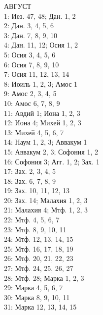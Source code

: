 \documentclass[fontsize=16pt,letterpaper,DIV=6]{scrartcl}
\begin{document}
\begin{multicols}{2}
АВГУСТ
\\  1: Иез. 47, 48; Дан. 1, 2
\\  2: Дан. 3, 4, 5, 6
\\  3: Дан. 7, 8, 9, 10
\\  4: Дан. 11, 12; Осия 1, 2
\\  5: Осия 3, 4, 5, 6
\\  6: Осия 7, 8, 9, 10
\\  7: Осия 11, 12, 13, 14
\\  8: Иоиль 1, 2, 3; Амос 1
\\  9: Амос 2, 3, 4, 5
\\  10: Амос 6, 7, 8, 9
\\  11: Авдий 1; Иона 1, 2, 3
\\  12: Иона 4; Михей 1, 2, 3
\\  13: Михей 4, 5, 6, 7
\\  14: Наум 1, 2, 3; Аввакум 1
\\  15: Аввакум 2, 3; Софония 1, 2
\\  16: Софония 3; Агг. 1, 2; Зах. 1
\\  17: Зах. 2, 3, 4, 5
\\  18: Зах. 6, 7, 8, 9
\\  19: Зах. 10, 11, 12, 13
\\  20: Зах. 14; Малахия 1, 2, 3
\\  21: Малахия 4; Мтф. 1, 2, 3
\\  22: Мтф. 4, 5, 6, 7
\\  23: Мтф. 8, 9, 10, 11
\\  24: Мтф. 12, 13, 14, 15
\\  25: Мтф. 16, 17, 18, 19
\\  26: Мтф. 20, 21, 22, 23
\\  27: Мтф. 24, 25, 26, 27
\\  28: Мтф. 28; Марка 1, 2, 3
\\  29: Марка 4, 5, 6, 7
\\  30: Марка 8, 9, 10, 11
\\  31: Марка 12, 13, 14, 15

\end{multicols}
\clearpage
\end{document}
